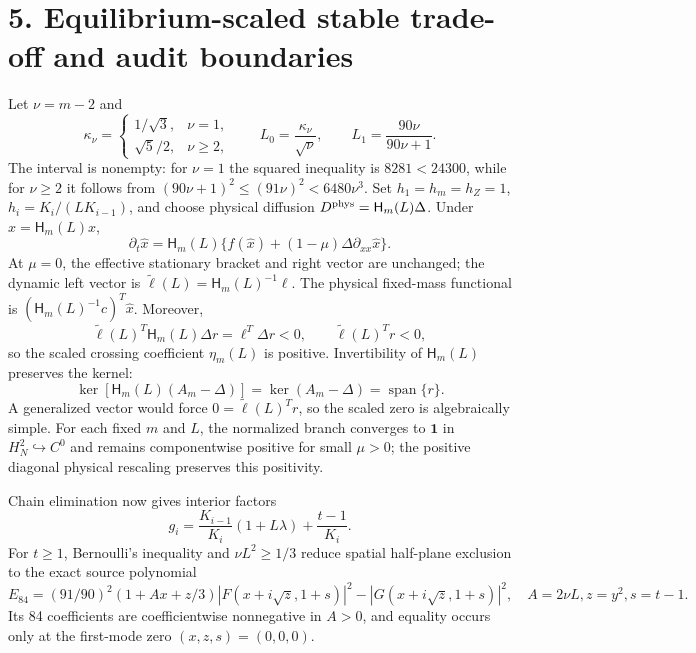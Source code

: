\documentclass[10pt]{article}
\begin{document}
\section*{5. Equilibrium-scaled stable trade-off and audit boundaries}
Let $\nu=m-2$ and
\[
 \kappa_\nu=\begin{cases}1/\sqrt3,&\nu=1,\\
 \sqrt5/2,&\nu\ge2,
 \end{cases}
 \qquad L_0=\frac{\kappa_\nu}{\sqrt\nu},
 \qquad L_1=\frac{90\nu}{90\nu+1}.
\]
The interval is nonempty: for $\nu=1$ the squared inequality is
$8281<24300$, while for $\nu\ge2$ it follows from
$(90\nu+1)^2\le(91\nu)^2<6480\nu^3$.  Set $h_1=h_m=h_Z=1$,
$h_i=K_i/(LK_{i-1})$, and choose physical diffusion
$D^{\rm phys}=\mathsf H_m(L)\Delta$. Under
$\widehat x=\mathsf H_m(L)x$,
\[
\partial_t\widehat x=\mathsf H_m(L)
\{f(\widehat x)+(1-\mu)\Delta\partial_{xx}\widehat x\}.
\]
At $\mu=0$, the effective stationary bracket and right vector are unchanged; the dynamic
left vector is $\widetilde\ell(L)=\mathsf H_m(L)^{-1}\ell$. The physical
fixed-mass functional is $(\mathsf H_m(L)^{-1}c)^T\widehat x$.
Moreover,
\[
\widetilde\ell(L)^T\mathsf H_m(L)\Delta r
=\ell^T\Delta r<0,
\qquad \widetilde\ell(L)^Tr<0,
\]
so the scaled crossing coefficient $\eta_m(L)$ is positive.
Invertibility of $\mathsf H_m(L)$ preserves the kernel:
\[
 \ker[\mathsf H_m(L)(A_m-\Delta)]
 =\ker(A_m-\Delta)=\operatorname{span}\{r\}.
\]
A generalized vector would force $0=\widetilde\ell(L)^Tr$, so the scaled
zero is algebraically simple.
For each fixed $m$ and $L$, the normalized branch converges to $\mathbf1$ in
$H_N^2\hookrightarrow C^0$ and remains componentwise positive for small
$\mu>0$; the positive diagonal physical rescaling preserves this positivity.

Chain elimination now gives interior factors
\[
g_i=\frac{K_{i-1}}{K_i}(1+L\lambda)+\frac{t-1}{K_i}.
\]
For $t\ge1$, Bernoulli's inequality and $\nu L^2\ge1/3$ reduce spatial
half-plane exclusion to the exact source polynomial
\[
E_{84}=(91/90)^2(1+Ax+z/3)|F(x+i\sqrt z,1+s)|^2
-|G(x+i\sqrt z,1+s)|^2,
\quad A=2\nu L, z=y^2, s=t-1.
\]
Its 84 coefficients are coefficientwise nonnegative in $A>0$, and equality
occurs only at the first-mode zero $(x,z,s)=(0,0,0)$.
\end{document}
